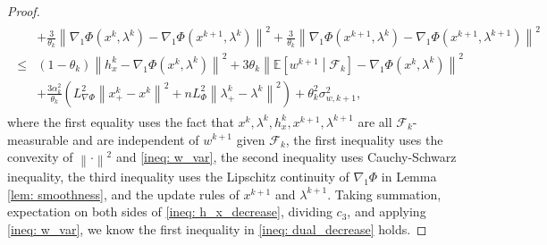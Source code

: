 \documentclass[10pt]{article}
\theoremstyle{remark}
\def\setF{\mathscr{F}} %
\newcommand{\E}{\mathbb{E}}
\newcommand{\norm}[1]{\left\|#1\right\|}
\begin{document}
\begin{proof}
\begin{align}
\begin{aligned}
        & + \frac{3}{\theta_k}\norm{\nabla_1\Phi(x^k, \lambda^k) - \nabla_1\Phi(x^{k+1}, \lambda^{k})}^2 + \frac{3}{\theta_k}\norm{\nabla_1\Phi(x^{k+1}, \lambda^k) - \nabla_1\Phi(x^{k+1}, \lambda^{k+1})}^2 \\
        \leq &(1 - \theta_k)\norm{h_x^k - \nabla_1\Phi(x^k, \lambda^k)}^2 + 3\theta_k\norm{\E\left[w^{k+1}\middle|\setF_k\right] - \nabla_1\Phi(x^k, \lambda^k)}^2 \\
        & + \frac{3\alpha_k^2}{\theta_k}\left(L_{\nabla \Phi}^2\norm{x_+^k - x^k}^2 + nL_{\Phi}^2\norm{\lambda_+^k - \lambda^k}^2\right) + \theta_k^2\sigma_{w,k+1}^2,
    \end{aligned}
\end{align}
where the first equality uses the fact that $x^k, \lambda^k, h_x^k, x^{k+1}, \lambda^{k+1}$ are all $\setF_k$-measurable and are independent of $w^{k+1}$ given $\setF_k$, the first inequality uses the convexity of $\norm{\cdot}^2$ and \eqref{ineq: w_var}, the second inequality uses Cauchy-Schwarz inequality, the third inequality uses the Lipschitz continuity of $\nabla_1\Phi$ in Lemma \ref{lem: smoothness}, and the update rules of $x^{k+1}$ and $\lambda^{k+1}$. Taking summation, expectation on both sides of \eqref{ineq: h_x_decrease}, dividing $c_3$, and applying \eqref{ineq: w_var}, we know the first inequality in \eqref{ineq: dual_decrease} holds.


\end{proof}
\end{document}
